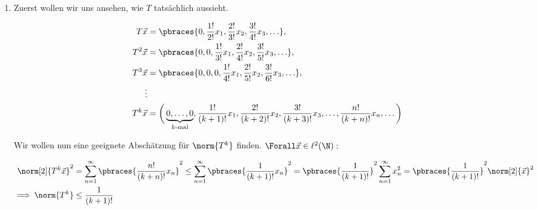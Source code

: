 \begin{solution}

\phantom{}

\begin{enumerate}[label = (\alph*)]

  \item
  Zuerst wollen wir uns ansehen, wie $T$ tatsächlich aussieht.

  \begin{align*}
    T \vec x
    & =
    \pbraces
    {
      0,
      \frac{1!}{2!} x_1,
      \frac{2!}{3!} x_2,
      \frac{3!}{4!} x_3,
      \ldots
    }, \\
    T^2 \vec x
    & =
    \pbraces
    {
      0, 0,
      \frac{1!}{3!} x_1,
      \frac{2!}{4!} x_2,
      \frac{3!}{5!} x_3,
      \ldots
    }, \\
    T^3 \vec x
    & =
    \pbraces
    {
      0, 0, 0,
      \frac{1!}{4!} x_1,
      \frac{2!}{5!} x_2,
      \frac{3!}{6!} x_3,
      \ldots
    }, \\
    \vdots \\
    T^k \vec x
    & =
    \bigg (
      \underbrace{0, \ldots, 0}_{k \text{-mal}},
      \frac{1!}{(k+1)!} x_1,
      \frac{2!}{(k+2)!} x_2,
      \frac{3!}{(k+3)!} x_3,
      \ldots,
      \frac{n!}{(k+n)!} x_n,
      \ldots
    \bigg )
  \end{align*}

  Wir wollen nun eine geeignete Abschätzung für $\norm{T^k}$ finden.
  $\Forall \vec x \in \ell^2(\N):$

  \begin{align*}
    \norm[2]{T^k \vec x}^2
    & =
    \sum_{n=1}^\infty
    \pbraces
    {
      \frac{n!}{(k+n)!}
      x_n
    }^2
    \leq
    \sum_{n=1}^\infty
    \pbraces
    {
      \frac{1}{(k+1)!}
      x_n
    }^2
    =
    \pbraces{\frac{1}{(k+1)!}}^2
    \sum_{n=1}^\infty x_n^2
    =
    \pbraces{\frac{1}{(k+1)!}}^2
    \norm[2]{\vec x}^2 \\
    \implies
    \norm{T^k}
    & \leq
    \frac{1}{(k+1)!}
  \end{align*}


\end{enumerate}
\end{solution}
